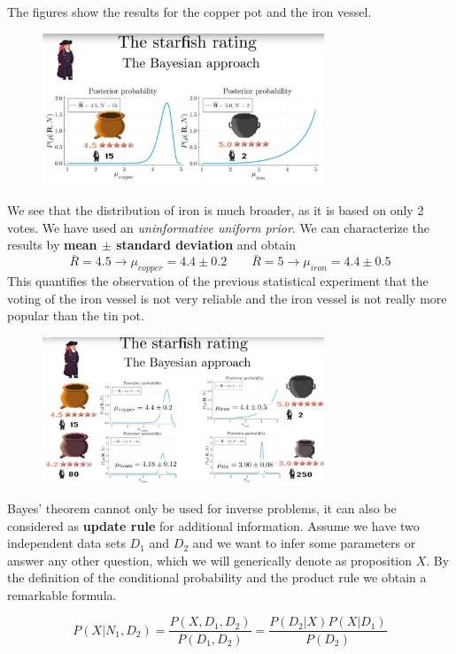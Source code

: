 \documentclass[12pt, a4paper]{scrartcl}
\begin{document}
The ﬁgures show the results for the copper pot and the iron vessel. %
 \begin{figure}[H]
	\centering
	\includegraphics[width=0.75\textwidth]{6_11.png}
\end{figure}
We see
that the distribution of iron is much broader, as it is based on only 2 votes. We
have used an \textit{uninformative uniform prior}.
We can characterize the results by \textbf{mean $\pm$ standard deviation} and
obtain \[\bar{R}=4.5\rightarrow \mu_{copper}=4.4\pm0.2\qquad \bar{R}=5\rightarrow \mu_{iron}=4.4\pm0.5\]
This quantiﬁes the observation of the previous statistical experiment that
the voting of the iron vessel is not very reliable and the iron vessel is not
really more popular than the tin pot.\\%
 \begin{figure}[H]
	\centering
	\includegraphics[width=0.75\textwidth]{6_12.png}
\end{figure}


Bayes’ theorem cannot only be used for inverse problems, it can also be considered 
as \textbf{update rule} for additional information.
Assume we have two independent data sets $D_1$ and $D_2$ and we want to infer
some parameters or answer any other question, which we will generically
denote as proposition $X$. By the deﬁnition of the conditional probability
and the product rule we obtain a remarkable formula.

\begin{equation*}\boxed{P(X|N_1,D_2)=\frac{P(X,D_1,D_2)}{P(D_1,D_2)}=\frac{P(D_2|X)P(X|D_1)}{P(D_2)}
}\end{equation*}\\
\end{document}

